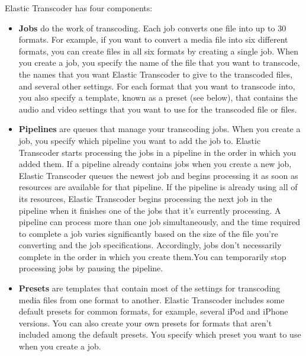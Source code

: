 Elastic Transcoder has four components:
\begin{itemize}

\item \textbf{Jobs} do the work of transcoding. Each job converts one file into up to 30 formats. For example, if you want to convert a media file into six different formats, you can create files in all six formats by creating a single job. When you create a job, you specify the name of the file that you want to transcode, the names that you want Elastic Transcoder to give to the transcoded files, and several other settings. For each format that you want to transcode into, you also specify a template, known as a preset (see below), that contains the audio and video settings that you want to use for the transcoded file or files.

\item \textbf{Pipelines} are queues that manage your transcoding jobs. When you create a job, you specify which pipeline you want to add the job to. Elastic Transcoder starts processing the jobs in a pipeline in the order in which you added them. If a pipeline already contains jobs when you create a new job, Elastic Transcoder queues the newest job and begins processing it as soon as resources are available for that pipeline. If the pipeline is already using all of its resources, Elastic Transcoder begins processing the next job in the pipeline when it finishes one of the jobs that it's currently processing. A pipeline can process more than one job simultaneously, and the time required to complete a job varies significantly based on the size of the file you're converting and the job specifications. Accordingly, jobs don't necessarily complete in the order in which you create them.You can temporarily stop processing jobs by pausing the pipeline.

\item \textbf{Presets} are templates that contain most of the settings for transcoding media files from one format to another. Elastic Transcoder includes some default presets for common formats, for example, several iPod and iPhone versions. You can also create your own presets for formats that aren't included among the default presets. You specify which preset you want to use when you create a job.



\end{itemize}
